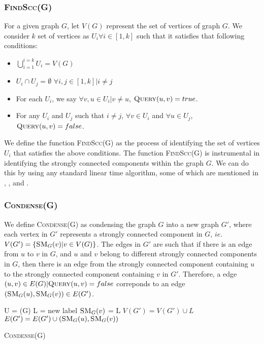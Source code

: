 \subsubsection{\textsc{FindScc}(G)}\label{Subsubsec: FindScc}
For a given graph $G$, let $V(G)$ represent the set of vertices of graph $G$.
We consider $k$ set of vertices as $U_i \forall i \in [1,k]$ such that it satisfies that following conditions:
\begin{itemize}
    \item $\bigcup\limits_{i=1}^{i=k}U_i = V(G)$
    \item $U_i \cap U_j = \emptyset$  $\forall i, j \in [1,k] | i \neq j$
    \item For each $U_i$, we say $\forall v, u \in U_i | v \neq u$, $\text{\textsc{Query}}(u, v) = true$.
    \item For any $U_i$ and $U_j$ such that $i \neq j$, $\forall v \in U_i$ and $\forall u \in U_j$, $\text{\textsc{Query}}(u, v) = false$.
\end{itemize}
We define the function \textsc{FindScc}(G) as the process of identifying the set of vertices $U_i$ that satisfies the above conditions.
The function \textsc{FindScc}(G) is instrumental in identifying the strongly connected components within the graph $G$.
We can do this by using any standard linear time algorithm, some of which are mentioned in \cite{find_scc_algorithm}, \cite{Kosaraju}, and \cite{DBLP:journals/corr/abs-2201-07197}.

\subsubsection{\textsc{Condense}(G)}\label{Subsubsec: Condense}

We define \textsc{Condense}(G) as condensing the graph $G$ into a new graph $G'$, where each vertex in $G'$ represents a strongly connected component in $G$,
$ie.$ $V(G') = \{\text{\textsc{SM}}_G(v) | v \in V(G)\}$.
The edges in $G'$ are such that if there is an edge from $u$ to $v$ in $G$, and $u$ and $v$ belong to different strongly connected components in $G$,
then there is an edge from the strongly connected component containing $u$ to the strongly connected component containing $v$ in $G'$. 
Therefore, a edge $(u, v) \in E(G) | \text{\textsc{Query}}(u, v) = false$ correponds to an edge $(\text{\textsc{SM}}_{G}(u), \text{\textsc{SM}}_{G}(v)) \in E(G')$.

\begin{algorithm}[H]
    \SetAlgoLined
    U = (G)\;
     {
        L = new label\;
         {
            $\text{\textsc{SM}}_G(v)$ = L\;
        }
        $V(G') = V(G')\cup L$
    }
     {
         {
            $E(G') = E(G') \cup (\text{\textsc{SM}}_G(u), \text{\textsc{SM}}_G(v))$
        }
    }

    \caption{\textsc{Condense}(G)}
\end{algorithm}

